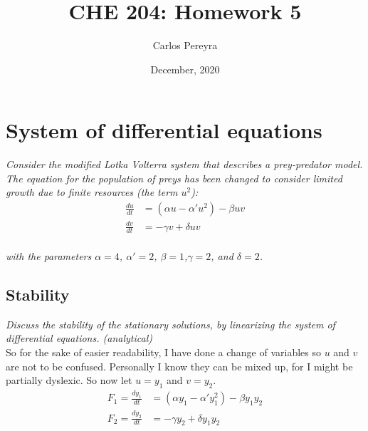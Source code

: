 \documentclass{article}
\begin{document}
 
 \title{CHE 204: Homework 5}
 \author{Carlos Pereyra}
 \date{December, 2020}
 \maketitle
 
 \section{System of differential equations}
\textit{Consider the modified Lotka Volterra system that describes a prey-predator model. The equation for the population of preys has been changed to consider limited growth due to finite resources (the term $u^2$):}\\
\begin{subequations}
\begin{align}
\label{eqn:given1} \frac{du}{dt} &= (\alpha u - \alpha' u^{2}) - \beta u v \\
\label{eqn:given2} \frac{dv}{dt} &= -\gamma v + \delta u v
\end{align}
\end{subequations}
\\
\textit{with the parameters $\alpha = 4$, $\alpha' = 2$, $\beta = 1$,$\gamma = 2$, and $\delta = 2$.}

\subsection{Stability}
\textit{Discuss the stability of the stationary solutions, by linearizing the system of differential equations. (analytical)}
\\
So for the sake of easier readability, I have done a change of variables so $u$ and $v$ are not to be confused. Personally I know they can be mixed up, for I might be partially dyslexic. So now let $u=y_1$ and $v=y_2$.
\begin{subequations}
\begin{align}
\label{eqn:base1} F_1 = \frac{dy_1}{dt} &= (\alpha y_1 - \alpha' y_1^2) - \beta y_1 y_2\\
\label{eqn:base2} F_2 = \frac{dy_2}{dt} &= -\gamma y_2 + \delta y_1 y_2
\end{align}
\end{subequations}
\end{document}
